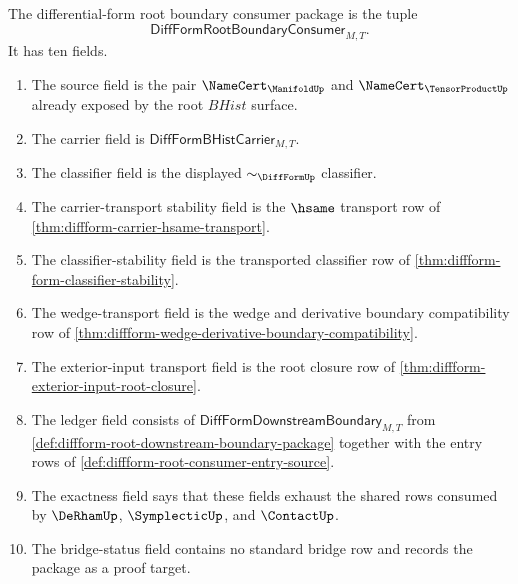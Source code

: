 \begin{definition}
\label{def:diffform-root-boundary-consumer-package}
The differential-form root boundary consumer package is the tuple
$$
\mathsf{DiffFormRootBoundaryConsumer}_{M,T}.
$$
It has ten fields.
\begin{enumerate}
\item The source field is the pair
$\NameCert_{\ManifoldUp}$ and $\NameCert_{\TensorProductUp}$ already exposed
by the root $BHist$ surface.
\item The carrier field is
$\mathsf{DiffFormBHistCarrier}_{M,T}$.
\item The classifier field is the displayed $\sim_{\DiffFormUp}$ classifier.
\item The carrier-transport stability field is the
$\hsame$ transport row of
\autoref{thm:diffform-carrier-hsame-transport}.
\item The classifier-stability field is the transported classifier row of
\autoref{thm:diffform-form-classifier-stability}.
\item The wedge-transport field is the wedge and derivative boundary
compatibility row of
\autoref{thm:diffform-wedge-derivative-boundary-compatibility}.
\item The exterior-input transport field is the root closure row of
\autoref{thm:diffform-exterior-input-root-closure}.
\item The ledger field consists of
$\mathsf{DiffFormDownstreamBoundary}_{M,T}$ from
\autoref{def:diffform-root-downstream-boundary-package} together with the
entry rows of \autoref{def:diffform-root-consumer-entry-source}.
\item The exactness field says that these fields exhaust the shared rows
consumed by $\DeRhamUp$, $\SymplecticUp$, and $\ContactUp$.
\item The bridge-status field contains no standard bridge row and records the
package as a proof target.
\end{enumerate}
\end{definition}

